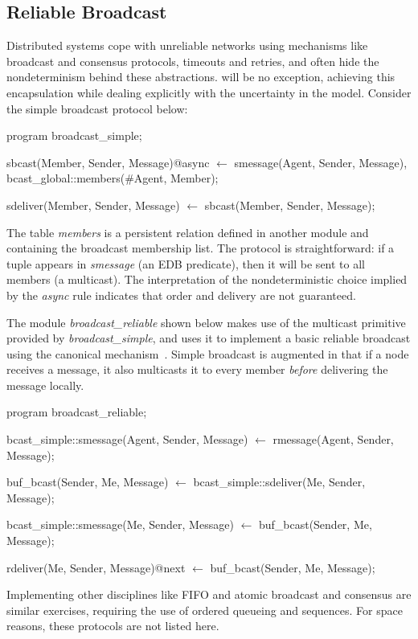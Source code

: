 \subsection{Reliable Broadcast}

Distributed systems cope with unreliable networks using mechanisms like broadcast and consensus protocols, 
timeouts and retries, and often hide the nondeterminism behind these abstractions.  \lang will be no exception,
achieving this encapsulation while dealing explicitly with the uncertainty in the model.  Consider the simple
broadcast protocol below:

\begin{Dedalus}

program broadcast_simple;

sbcast(Member, Sender, Message)@async \(\leftarrow\)
    smessage(Agent, Sender, Message),
    bcast_global::members(#Agent, Member);

sdeliver(Member, Sender, Message) \(\leftarrow\)
    sbcast(Member, Sender, Message);

\end{Dedalus}

The table \emph{members} is a persistent relation defined in another module and containing the broadcast 
membership list.  
The protocol is straightforward: if a tuple appears in \emph{smessage} (an EDB predicate), then
it will be sent to all members (a multicast).  The interpretation of the nondeterministic choice implied by the
\emph{async} rule indicates that order and delivery are not guaranteed.

The module \emph{broadcast\_reliable} shown below makes use of the multicast primitive provided by \emph{broadcast\_simple}, and
uses it to implement a basic reliable broadcast using the canonical mechanism~\cite{mullender}. 
Simple broadcast is augmented in that if a node receives a message, it 
also multicasts it to every member \emph{before} delivering the message locally.  


\begin{Dedalus}
program broadcast_reliable;

bcast_simple::smessage(Agent, Sender, Message)  \(\leftarrow\)
    rmessage(Agent, Sender, Message);

buf_bcast(Sender, Me, Message)  \(\leftarrow\)
    bcast_simple::sdeliver(Me, Sender, Message);

bcast_simple::smessage(Me, Sender, Message)  \(\leftarrow\)
    buf_bcast(Sender, Me, Message);

rdeliver(Me, Sender, Message)@next  \(\leftarrow\)
    buf_bcast(Sender, Me, Message);

\end{Dedalus}


Implementing other disciplines like FIFO and atomic broadcast and consensus are similar exercises, requiring the use of
ordered queueing and sequences.  For space reasons, these protocols are not listed here.